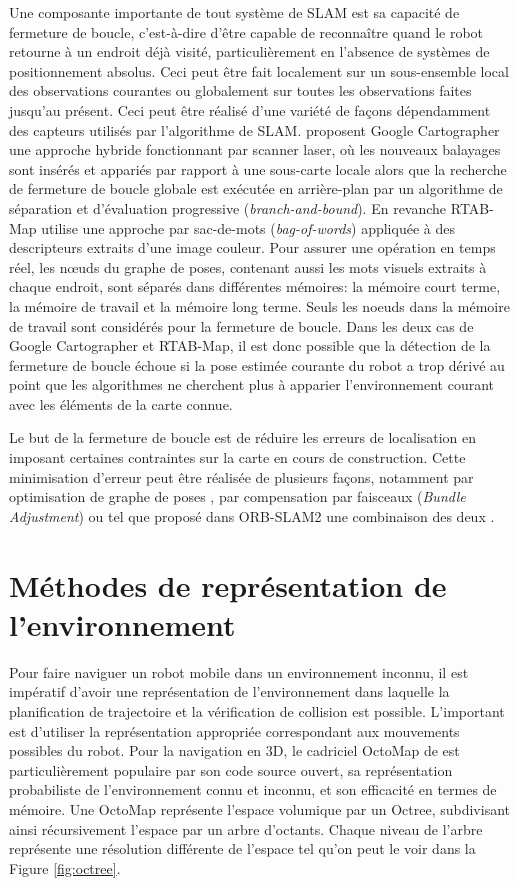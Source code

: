 Une composante importante de tout système de SLAM est sa capacité de fermeture de boucle, c'est-à-dire d'être capable de reconnaître quand le robot retourne à un endroit déjà visité, particulièrement en l'absence de systèmes de positionnement absolus. Ceci peut être fait localement sur un sous-ensemble local des observations courantes ou globalement sur toutes les observations faites jusqu'au présent. Ceci peut être réalisé d'une variété de façons dépendamment des capteurs utilisés par l'algorithme de SLAM. \cite{Hess2016} proposent Google Cartographer une approche hybride fonctionnant par scanner laser, où les nouveaux balayages sont insérés et appariés par rapport à une sous-carte locale alors que la recherche de fermeture de boucle globale est exécutée en arrière-plan par un algorithme de séparation et d'évaluation progressive (\textit{branch-and-bound}). En revanche RTAB-Map \citep{Labbe2014} utilise une approche par sac-de-mots (\textit{bag-of-words}) appliquée à des descripteurs extraits d'une image couleur. Pour assurer une opération en temps réel, les n\oe uds du graphe de poses, contenant aussi les mots visuels extraits à chaque endroit, sont séparés dans différentes mémoires: la mémoire court terme, la mémoire de travail et la mémoire long terme. Seuls les noeuds dans la mémoire de travail sont considérés pour la fermeture de boucle. Dans les deux cas de Google Cartographer et RTAB-Map, il est donc possible que la détection de la fermeture de boucle échoue si la pose estimée courante du robot a trop dérivé au point que les algorithmes ne cherchent plus à apparier l'environnement courant avec les éléments de la carte connue.

Le but de la fermeture de boucle est de réduire les erreurs de localisation en imposant certaines contraintes sur la carte en cours de construction. Cette minimisation d'erreur peut être réalisée de plusieurs façons, notamment par optimisation de graphe de poses \citep{Carlone2016}, par compensation par faisceaux (\textit{Bundle Adjustment}) \citep{Mei2011} ou tel que proposé dans ORB-SLAM2 une combinaison des deux \citep{Mur-Artal2017}.

\section{Méthodes de représentation de l'environnement}\label{subsec:representations}

Pour faire naviguer un robot mobile dans un environnement inconnu, il est impératif d'avoir une représentation de l'environnement dans laquelle la planification de trajectoire et la vérification de collision est possible. L'important est d'utiliser la représentation appropriée correspondant aux mouvements possibles du robot. Pour la navigation en 3D, le cadriciel OctoMap de \citep{Hornung2013} est particulièrement populaire par son code source ouvert, sa représentation probabiliste de l'environnement connu et inconnu, et son efficacité en termes de mémoire. Une OctoMap représente l'espace volumique par un Octree, subdivisant ainsi récursivement l'espace par un arbre d'octants. Chaque niveau de l'arbre représente une résolution différente de l'espace tel qu'on peut le voir dans la Figure \ref{fig:octree}.

